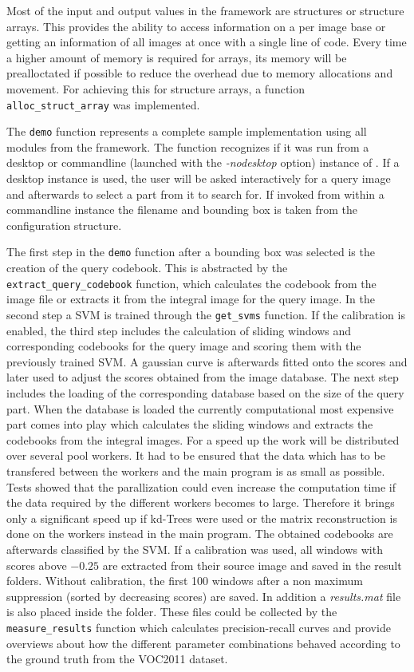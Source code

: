 Most of the input and output values in the framework are structures or structure arrays. This provides the ability to access information on a per image base or getting an information of all images at once with a single line of code. Every time a higher amount of memory is required for arrays, its memory will be prealloctated if possible to reduce the overhead due to memory allocations and movement. For achieving this for structure arrays, a function \verb|alloc_struct_array| was implemented.

The \verb|demo| function represents a complete sample implementation using all modules from the framework. The function recognizes if it was run from a desktop or commandline (launched with the \textit{-nodesktop} option) instance of \MATLAB. If a desktop instance is used, the user will be asked interactively for a query image and afterwards to select a part from it to search for. If invoked from within a commandline instance the filename and bounding box is taken from the configuration structure.

The first step in the \verb|demo| function after a bounding box was selected is the creation of the query codebook. This is abstracted by the \verb|extract_query_codebook| function, which calculates the codebook from the image file or extracts it from the integral image for the query image. In the second step a \ac{SVM} is trained through the \verb|get_svms| function. If the calibration is enabled, the third step includes the calculation of sliding windows and corresponding codebooks for the query image and scoring them with the previously trained \ac{SVM}. A gaussian curve is afterwards fitted onto the scores and later used to adjust the scores obtained from the image database. The next step includes the loading of the corresponding database based on the size of the query part. When the database is loaded the currently computational most expensive part comes into play which calculates the sliding windows and extracts the codebooks from the integral images. For a speed up the work will be distributed over several pool workers. It had to be ensured that the data which has to be transfered between the workers and the main program is as small as possible. Tests showed that the parallization could even increase the computation time if the data required by the different workers becomes to large. Therefore it brings only a significant speed up if kd-Trees were used or the matrix reconstruction is done on the workers instead in the main program. The obtained codebooks are afterwards classified by the \ac{SVM}. If a calibration was used, all windows with scores above $-0.25$ are extracted from their source image and saved in the result folders. Without calibration, the first 100 windows after a non maximum suppression (sorted by decreasing scores) are saved. In addition a \textit{results.mat} file is also placed inside the folder. These files could be collected by the \verb|measure_results| function which calculates precision-recall curves and provide overviews about how the different parameter combinations behaved according to the ground truth from the \ac{VOC2011} dataset.


